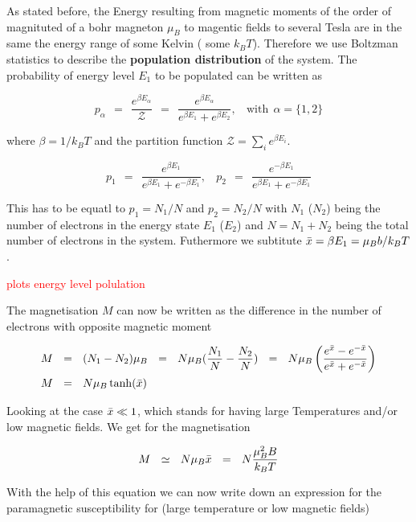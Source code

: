 \documentclass[10pt]{report}
\numberwithin{equation}{chapter}
\begin{document}
As stated before, the Energy resulting from magnetic moments of the order of magnituted of a bohr magneton $\mu_B$ to magentic fields to several Tesla are in the same the energy range of some Kelvin ( some $k_B T$). Therefore we use Boltzman statistics to describe the \textbf{population distribution} of the system. The probability of energy level $E_1$ to be populated can be written as

\begin{equation}
  p_\alpha ~~=~~ \frac{e^{\beta E_\alpha}}{\mathcal{Z}} ~~=~~ \frac{e^{\beta E_\alpha}}{e^{\beta E_1} + e^{\beta E_2}}, ~~~~ \text{with} ~~ \alpha = \{1,2\}
\end{equation}


where $\beta = 1/k_BT$ and the partition function $\mathcal{Z} = \sum_i e^{\beta E_i}$. 


\begin{equation}
  p_1 ~~=~~ \frac{e^{ \beta E_1}}{e^{\beta E_1} + e^{-\beta E_1}}, ~~~~ 
  p_2 ~~=~~ \frac{e^{-\beta E_1}}{e^{\beta E_1} + e^{-\beta E_1}}
\end{equation}

This has to be equatl to $p_1 = N_1/N$ and $p_2 = N_2/N$ with $N_1$ ($N_2$) being the number of electrons in the energy state $E_1$ ($E_2$) and $N = N_1 + N_2$ being the total number of electrons in the system. Futhermore we subtitute $\Bar{x} = \beta E_1 = \mu_B b/k_B T$.

\textcolor{red}{plots energy level polulation}


The magnetisation $M$ can now be written as the difference in the number of electrons with opposite magnetic moment

\begin{align}
  M ~~& =~~ (N_1 - N_2) \mu_B ~~=~~ N \mu_B (\frac{N_1}{N} - \frac{N_2}{N}) ~~=~~ 
  N \mu_B \left( \frac{e^{\Bar{x}} - e^{-\Bar{x}}}{e^{\Bar{x}} + e^{-\Bar{x}}} \right) \nonumber \\
  M ~~& =~~ N \mu_B \tanh(\Bar{x})
\end{align}


Looking at the case $\Bar{x} \ll 1$, which stands for having large Temperatures and/or low magnetic fields. We get for the magnetisation

\begin{equation}
  M ~~\simeq~~ N \mu_B \Bar{x} ~~=~~ N \frac{\mu_B^2 B}{k_B T}
\end{equation}

With the help of this equation we can now write down an expression for the paramagnetic susceptibility for (large temperature or low magnetic fields)
\end{document}
